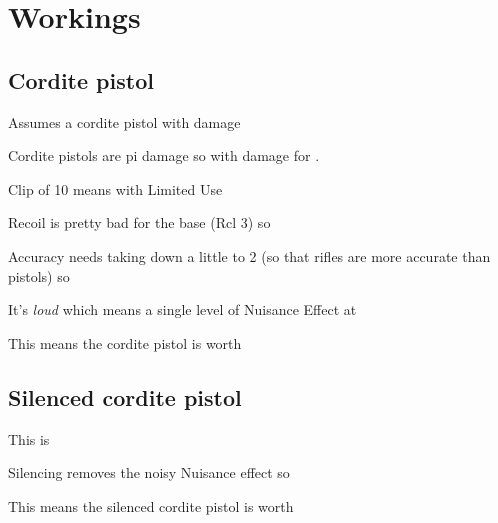 \section{Workings}
\label{sec:workings}



\subsection{Cordite pistol}
\label{sec:cordite-pistol}

Assumes a cordite pistol with  damage

\begin{innateattack}
  \item Cordite pistols are pi damage so  with
     damage for .
  \item Clip of 10 means  with Limited Use
  \item Recoil is pretty bad for the base (Rcl 3) so
  \item Accuracy needs taking down a little to 2 (so that rifles are more
    accurate than pistols) so 
  \item It's \emph{loud} which means a single level of Nuisance Effect at
  \item This means the cordite pistol is worth \InnateAttackTotalPoints{}
\end{innateattack}

\begin{center}
  \InnateAttackBreakdown
\end{center}
\subsection{Silenced cordite pistol}
\label{sec:silenc-cord-pist}

\begin{innateattack}
  \item This is 
  \item Silencing removes the noisy Nuisance effect so
  \item This means the silenced cordite pistol is worth
    \InnateAttackTotalPoints{}
\end{innateattack}

